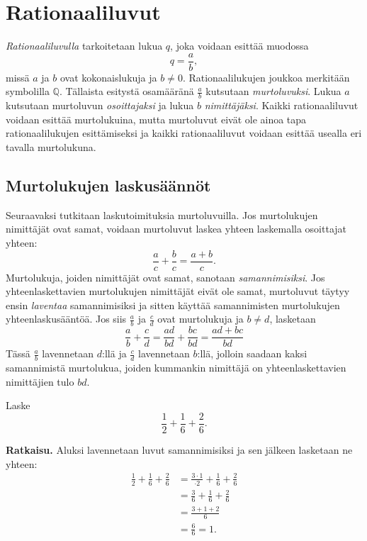\chapter{Rationaaliluvut}
    \label{rationaaliluvut}
    
    \emph{Rationaaliluvulla} tarkoitetaan lukua $q$, joka voidaan esittää muodossa
    \[
    q=\frac{a}{b}, 
    \]
    missä $a$ ja $b$ ovat kokonaislukuja ja $b\neq 0$. Rationaalilukujen joukkoa
    merkitään symbolilla $\mathbb{Q}$. Tällaista esitystä osamääränä $\frac{a}{b}$
    kutsutaan \emph{murtoluvuksi}. Lukua $a$ kutsutaan murtoluvun
    \emph{osoittajaksi} ja lukua $b$ \emph{nimittäjäksi}. Kaikki rationaaliluvut
    voidaan esittää murtolukuina, mutta murtoluvut eivät ole ainoa tapa
    rationaalilukujen esittämiseksi ja kaikki rationaaliluvut voidaan esittää
    usealla eri tavalla murtolukuna.
    

\section{Murtolukujen laskusäännöt}

    Seuraavaksi tutkitaan laskutoimituksia murtoluvuilla. Jos murtolukujen
    nimittäjät ovat samat, voidaan murtoluvut laskea yhteen laskemalla
    osoittajat yhteen:
    \[
    \frac{a}{c} + \frac{b}{c} = \frac{a+b}{c}.
    \]
    Murtolukuja, joiden nimittäjät ovat samat, sanotaan \emph{samannimisiksi}.
    Jos yhteenlaskettavien murtolukujen nimittäjät eivät ole samat, murtoluvut
    täytyy ensin \emph{laventaa} samannimisiksi ja sitten käyttää samannimisten
    murtolukujen yhteenlaskusääntöä.
    Jos siis $\frac{a}{b}$ ja $\frac{c}{d}$ ovat murtolukuja ja $b\neq d$, lasketaan
    \[
    \frac{a}{b} + \frac{c}{d} = \frac{ad}{bd} + \frac{bc}{bd} = \frac{ad+bc}{bd}
    \]
    Tässä $\frac{a}{b}$ lavennetaan $d$:llä ja $\frac{c}{d}$ lavennetaan
    $b$:llä, jolloin saadaan kaksi samannimistä murtolukua, joiden kummankin
    nimittäjä on yhteenlaskettavien nimittäjien tulo $bd$.
    
    \begin{esimerkki}
        Laske
        \[
        \frac{1}{2} + \frac{1}{6} + \frac{2}{6}.
        \]
        
        \textbf{Ratkaisu.}
        Aluksi lavennetaan luvut samannimisiksi ja sen jälkeen lasketaan ne yhteen:
        \begin{eqnarray*}
            \frac{1}{2} + \frac{1}{6} + \frac{2}{6}
            &=
            \frac{3\cdot 1}{\cdot 2} + \frac{1}{6} + \frac{2}{6}\\
            &=
            \frac{3}{6} + \frac{1}{6} + \frac{2}{6}\\
            &= \frac{3+1+2}{6}\\ &= \frac{6}{6} = 1.
        \end{eqnarray*}
    \end{esimerkki}
    
